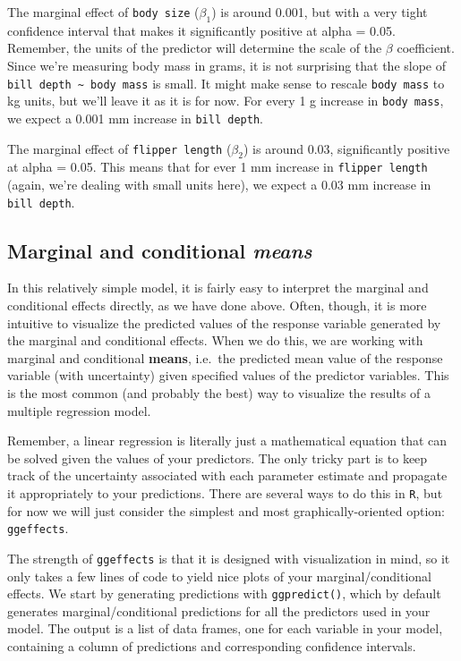 \documentclass[
]{article}
\begin{document}
The marginal effect of \texttt{body\ size} (\(\beta_1\)) is around
0.001, but with a very tight confidence interval that makes it
significantly positive at alpha = 0.05. Remember, the units of the
predictor will determine the scale of the \(\beta\) coefficient. Since
we're measuring body mass in grams, it is not surprising that the slope
of \texttt{bill\ depth\ \textasciitilde{}\ body\ mass} is small. It
might make sense to rescale \texttt{body\ mass} to kg units, but we'll
leave it as it is for now. For every 1 g increase in
\texttt{body\ mass}, we expect a 0.001 mm increase in
\texttt{bill\ depth}.

The marginal effect of \texttt{flipper\ length} (\(\beta_2\)) is around
0.03, significantly positive at alpha = 0.05. This means that for ever 1
mm increase in \texttt{flipper\ length} (again, we're dealing with small
units here), we expect a 0.03 mm increase in \texttt{bill\ depth}.

\hypertarget{marginal-and-conditional-means}{%
\subsection{\texorpdfstring{Marginal and conditional
\emph{means}}{Marginal and conditional means}}\label{marginal-and-conditional-means}}

In this relatively simple model, it is fairly easy to interpret the
marginal and conditional effects directly, as we have done above. Often,
though, it is more intuitive to visualize the predicted values of the
response variable generated by the marginal and conditional effects.
When we do this, we are working with marginal and conditional
\textbf{means}, i.e.~the predicted mean value of the response variable
(with uncertainty) given specified values of the predictor variables.
This is the most common (and probably the best) way to visualize the
results of a multiple regression model.

Remember, a linear regression is literally just a mathematical equation
that can be solved given the values of your predictors. The only tricky
part is to keep track of the uncertainty associated with each parameter
estimate and propagate it appropriately to your predictions. There are
several ways to do this in \texttt{R}, but for now we will just consider
the simplest and most graphically-oriented option: \texttt{ggeffects}.

The strength of \texttt{ggeffects} is that it is designed with
visualization in mind, so it only takes a few lines of code to yield
nice plots of your marginal/conditional effects. We start by generating
predictions with \texttt{ggpredict()}, which by default generates
marginal/conditional predictions for all the predictors used in your
model. The output is a list of data frames, one for each variable in
your model, containing a column of predictions and corresponding
confidence intervals.
\end{document}
